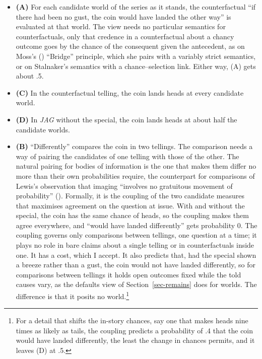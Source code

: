 \documentclass[
  11pt,
  letterpaper,
  DIV=11,
  numbers=noendperiod,
  twoside]{scrartcl}
\providecommand{\tightlist}{%
  \setlength{\itemsep}{0pt}\setlength{\parskip}{0pt}}
\begin{document}
\begin{itemize}
\tightlist
\item
  \textbf{(A)} For each candidate world of the series as it stands, the
  counterfactual ``if there had been no gust, the coin would have landed
  the other way'' is evaluated at that world. The view needs no
  particular semantics for counterfactuals, only that credence in a
  counterfactual about a chancy outcome goes by the chance of the
  consequent given the antecedent, as on Moss's
  () ``Bridge'' principle, which she pairs
  with a variably strict semantics, or on Stalnaker's semantics with a
  chance--selection link. Either way, (A) gets about .5.
\item
  \textbf{(C)} In the counterfactual telling, the coin lands heads at
  every candidate world.
\item
  \textbf{(D)} In \emph{JAG} without the special, the coin lands heads
  at about half the candidate worlds.
\item
  \textbf{(B)} ``Differently'' compares the coin in two tellings. The
  comparison needs a way of pairing the candidates of one telling with
  those of the other. The natural pairing for bodies of information is
  the one that makes them differ no more than their own probabilities
  require, the counterpart for comparisons of Lewis's observation that
  imaging ``involves no gratuitous movement of probability''
  (). Formally, it is the coupling of
  the two candidate measures that maximises agreement on the question at
  issue. With and without the special, the coin has the same chance of
  heads, so the coupling makes them agree everywhere, and ``would have
  landed differently'' gets probability 0. The coupling governs only
  comparisons between tellings, one question at a time; it plays no role
  in bare claims about a single telling or in counterfactuals inside
  one. It has a cost, which I accept. It also predicts that, had the
  special shown a breeze rather than a gust, the coin would not have
  landed differently, so for comparisons between tellings it holds open
  outcomes fixed while the told causes vary, as the defaults view of
  Section~\ref{sec-remains} does for worlds. The difference is that it
  posits no world.\footnote{For a detail that shifts the in-story
    chances, say one that makes heads nine times as likely as tails, the
    coupling predicts a probability of .4 that the coin would have
    landed differently, the least the change in chances permits, and it
    leaves (D) at .5.}
\end{itemize}
\end{document}
